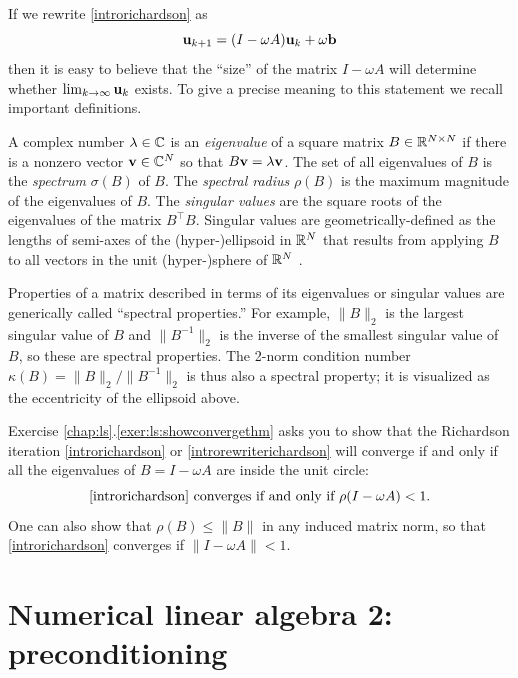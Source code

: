 \medskip
If we rewrite \eqref{introrichardson} as
\begin{equation}
\mathbf{u}_{k+1} = (I - \omega A) \mathbf{u}_k + \omega \mathbf{b}  \label{introrewriterichardson}
\end{equation}
then it is easy to believe that the ``size'' of the matrix $I-\omega A$ will determine whether $\lim_{k\to\infty} \mathbf{u}_k$ exists.  To give a precise meaning to this statement we recall important definitions.

A complex number $\lambda \in \mathbb{C}$ is an \emph{eigenvalue} of a square matrix $B\in\mathbb{R}^{N\times N}$ if there is a nonzero vector $\mathbf{v}\in\mathbb{C}^N$ so that $B \mathbf{v} = \lambda \mathbf{v}$.  The set of all eigenvalues of $B$ is the \emph{spectrum} $\sigma(B)$ of $B$.  The \emph{spectral radius} $\rho(B)$ is the maximum magnitude of the eigenvalues of $B$.  The \emph{singular values} are the square roots of the eigenvalues of the matrix $B^\top B$.  Singular values are geometrically-defined as the lengths of semi-axes of the (hyper-)ellipsoid in $\mathbb{R}^N$ that results from applying $B$ to all vectors in the unit (hyper-)sphere of $\mathbb{R}^N$ \citep{TrefethenBau1997}.

Properties of a matrix described in terms of its eigenvalues or singular values are generically called ``spectral properties.''  For example, $\|B\|_2$ is the largest singular value of $B$ and $\|B^{-1}\|_2$ is the inverse of the smallest singular value of $B$, so these are spectral properties.  The 2-norm condition number $\kappa(B)=\|B\|_2/\|B^{-1}\|_2$ is thus also a spectral property; it is visualized as the eccentricity of the ellipsoid above.

Exercise \ref{chap:ls}.\ref{exer:ls:showconvergethm} asks you to show that the Richardson iteration \eqref{introrichardson} or \eqref{introrewriterichardson} will converge if and only if all the eigenvalues of $B=I-\omega A$ are inside the unit circle:
\begin{equation}
\text{\eqref{introrichardson} converges if and only if } \rho(I-\omega A) < 1. \label{introconvergethm}
\end{equation}
One can also show that $\rho(B) \le \|B\|$ in any induced matrix norm, so that \eqref{introrichardson} converges if $\|I-\omega A\| < 1$.


\section{Numerical linear algebra 2: preconditioning}

